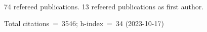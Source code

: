 74 refereed publications. 13 refeered publications as first author.

Total citations~=~3546; h-index~=~34 (2023-10-17)